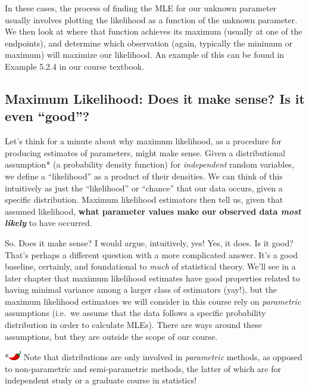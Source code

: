 \documentclass[
  letterpaper,
  DIV=11,
  numbers=noendperiod]{scrreprt}
\begin{document}
In these cases, the process of finding the MLE for our unknown parameter
usually involves plotting the likelihood as a function of the unknown
parameter. We then look at where that function achieves its maximum
(usually at one of the endpoints), and determine which observation
(again, typically the minimum or maximum) will maximize our likelihood.
An example of this can be found in Example 5.2.4 in our course textbook.

\hypertarget{maximum-likelihood-does-it-make-sense-is-it-even-good}{%
\subsection*{Maximum Likelihood: Does it make sense? Is it even
``good''?}\label{maximum-likelihood-does-it-make-sense-is-it-even-good}}

Let's think for a minute about why maximum likelihood, as a procedure
for producing estimates of parameters, might make sense. Given a
distributional assumption* (a probability density function) for
\emph{independent} random variables, we define a ``likelihood'' as a
product of their densities. We can think of this intuitively as just the
``likelihood'' or ``chance'' that our data occurs, given a specific
distribution. Maximum likelihood estimators then tell us, given that
assumed likelihood, \textbf{what parameter values make our observed data
\emph{most likely}} to have occurred.

So. Does it make sense? I would argue, intuitively, yes! Yes, it does.
Is it good? That's perhaps a different question with a more complicated
answer. It's a good baseline, certainly, and foundational to \emph{much}
of statistical theory. We'll see in a later chapter that maximum
likelihood estimates have good properties related to having minimal
variance among a larger class of estimators (yay!), but the maximum
likelihood estimators we will consider in this course rely on
\emph{parametric} assumptions (i.e.~we assume that the data follows a
specific probability distribution in order to calculate MLEs). There are
ways around these assumptions, but they are outside the scope of our
course.

*\includegraphics[width=0.20833in,height=0.16667in]{images/chilipepper.png}
Note that distributions are only involved in \emph{parametric} methods,
as opposed to non-parametric and semi-parametric methods, the latter of
which are for independent study or a graduate course in statistics!
\end{document}
